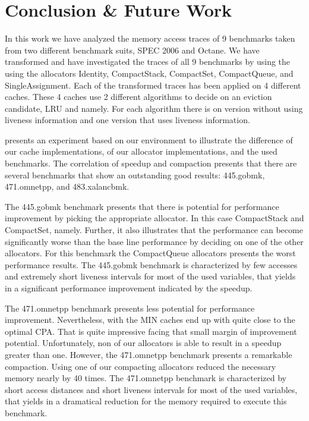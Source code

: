 \documentclass[onecolumn, openright, master, english, signatures]{dbrgrptt}
\begin{document}

\chapter{Conclusion \& Future Work}\label{cha:conclusion}

In this work we have analyzed the memory access traces of 9 benchmarks taken from two different benchmark suits, SPEC 2006 and Octane. We have transformed and have investigated the traces of all 9 benchmarks by using the using the allocators Identity, CompactStack, CompactSet, CompactQueue, and SingleAssignment. Each of the transformed traces has been applied on 4 different caches. These 4 caches use 2 different algorithms to decide on an eviction candidate, \ac{LRU} and \citeauthor{belady1966study} namely. For each algorithm there is on version without using liveness information and one version that uses liveness information.

 presents an experiment based on our environment to illustrate the difference of our cache implementations, of our allocator implementations, and the used benchmarks.
The correlation of speedup and compaction presents that there are several benchmarks that show an outstanding good results: 445.gobmk, 471.omnetpp, and 483.xalancbmk.

The 445.gobmk benchmark presents that there is potential for performance improvement by picking the appropriate allocator. In this case CompactStack and CompactSet, namely. Further, it also illustrates that the performance can become significantly worse than the base line performance by deciding on one of the other allocators. For this benchmark the CompactQueue allocators presents the worst performance results. The 445.gobmk benchmark is characterized by few accesses and extremely short liveness intervals for most of the used variables, that yields in a significant performance improvement indicated by the speedup.

The 471.omnetpp benchmark presents less potential for performance improvement. Nevertheless, with the \ac{MIN} caches end up with quite close to the optimal \ac{CPA}. That is quite impressive facing that small margin of improvement potential. Unfortunately, non of our allocators is able to result in a speedup greater than one. However, the 471.omnetpp benchmark presents a remarkable compaction. Using one of our compacting allocators reduced the necessary memory nearly by 40 times. The 471.omnetpp benchmark is characterized by short access distances and short liveness intervals for most of the used variables, that yields in a dramatical reduction for the memory required to execute this benchmark.
\end{document}
